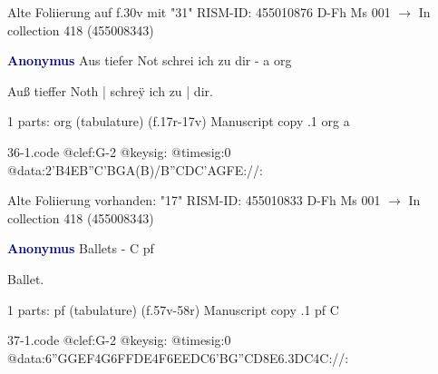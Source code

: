 \documentclass[twocolumn]{book}
\begin{document}
\newline Alte Foliierung auf f.30v mit "31"
\newline RISM-ID: 455010876
\newline D-Fh  Ms 001
\newline $\rightarrow$ In collection 418 (455008343)
      
\newline \par \vspace{7pt} \textcolor{darkblue}{\textbf{Anonymus  }}
\newline Aus tiefer Not schrei ich zu dir - a
\newline org
\newline \begin{itshape}[f.17r, at left:] Auß tieffer Noth | schreÿ ich zu | dir.\end{itshape} 
\newline \textcolor{darkblue}{}  1 parts: org (tabulature)  (f.17r-17v)
\newline Manuscript copy
.1  org  a  
\begin{filecontents*}{36-1.code}
@clef:G-2
@keysig:
@timesig:0
@data:2'B4EB''C'BGA(B)/B''CDC'AGFE://:
\end{filecontents*}
\newline
%

\newline Alte Foliierung vorhanden: "17"
\newline RISM-ID: 455010833
\newline D-Fh  Ms 001
\newline $\rightarrow$ In collection 418 (455008343)
      
\newline \par \vspace{7pt} \textcolor{darkblue}{\textbf{Anonymus  }}
\newline Ballets - C
\newline pf
\newline \begin{itshape}[f.57v, at left:] Ballet.\end{itshape} 
\newline \textcolor{darkblue}{}  1 parts: pf (tabulature)  (f.57v-58r)
\newline Manuscript copy
.1  pf  C  
\begin{filecontents*}{37-1.code}
@clef:G-2
@keysig:
@timesig:0
@data:{6''GGEF}4G{6FFDE}4F{6EEDC}{6'BG''CD}{8E6.3DC}4C://:
\end{filecontents*}
\newline
%
\end{document}
